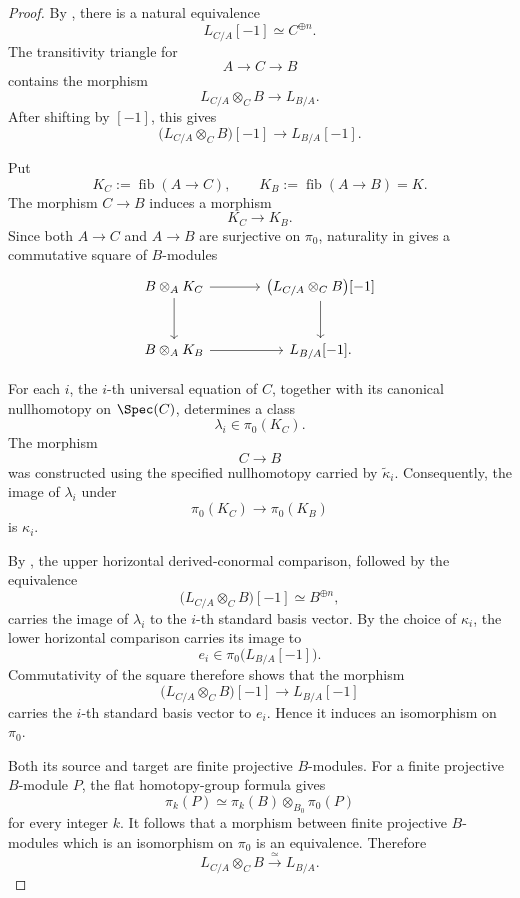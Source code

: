 \begin{proof}
By , there is a natural
equivalence
\[
    L_{C/A}[-1]
    \simeq
    C^{\oplus n}.
\]
The transitivity triangle for
\[
    A
    \longrightarrow
    C
    \longrightarrow
    B
\]
contains the morphism
\[
    L_{C/A}\otimes_CB
    \longrightarrow
    L_{B/A}.
\]
After shifting by \([-1]\), this gives
\[
    \bigl(
        L_{C/A}\otimes_CB
    \bigr)[-1]
    \longrightarrow
    L_{B/A}[-1].
\]

Put
\[
    K_C
    :=
    \operatorname{fib}(A\to C),
    \qquad
    K_B
    :=
    \operatorname{fib}(A\to B)=K.
\]
The morphism \(C\to B\) induces a morphism
\[
    K_C
    \longrightarrow
    K_B.
\]
Since both \(A\to C\) and \(A\to B\) are surjective on \(\pi_0\),
naturality in
gives a commutative square of \(B\)-modules
\[
\begin{tikzcd}[column sep=large, row sep=large]
    B\otimes_AK_C
        \arrow[r]
        \arrow[d]
    &
    \bigl(
        L_{C/A}\otimes_CB
    \bigr)[-1]
        \arrow[d]
    \\
    B\otimes_AK_B
        \arrow[r]
    &
    L_{B/A}[-1].
\end{tikzcd}
\]

For each \(i\), the \(i\)-th universal equation of \(C\), together with
its canonical nullhomotopy on \(\Spec(C)\), determines a class
\[
    \lambda_i
    \in
    \pi_0(K_C).
\]
The morphism
\[
    C
    \longrightarrow
    B
\]
was constructed using the specified nullhomotopy carried by
\(\widetilde\kappa_i\). Consequently, the image of \(\lambda_i\) under
\[
    \pi_0(K_C)
    \longrightarrow
    \pi_0(K_B)
\]
is \(\kappa_i\).

By
,
the upper horizontal derived-conormal comparison, followed by the
equivalence
\[
    \bigl(
        L_{C/A}\otimes_CB
    \bigr)[-1]
    \simeq
    B^{\oplus n},
\]
carries the image of \(\lambda_i\) to the \(i\)-th standard basis
vector. By the choice of \(\kappa_i\), the lower horizontal comparison
carries its image to
\[
    e_i
    \in
    \pi_0
    \bigl(
        L_{B/A}[-1]
    \bigr).
\]
Commutativity of the square therefore shows that the morphism
\[
    \bigl(
        L_{C/A}\otimes_CB
    \bigr)[-1]
    \longrightarrow
    L_{B/A}[-1]
\]
carries the \(i\)-th standard basis vector to \(e_i\). Hence it induces
an isomorphism on \(\pi_0\).

Both its source and target are finite projective \(B\)-modules. For a
finite projective \(B\)-module \(P\), the flat homotopy-group formula
gives
\[
    \pi_k(P)
    \simeq
    \pi_k(B)
    \otimes_{B_0}
    \pi_0(P)
\]
for every integer \(k\). It follows that a morphism between finite
projective \(B\)-modules which is an isomorphism on \(\pi_0\) is an
equivalence. Therefore
\[
    L_{C/A}\otimes_CB
    \xrightarrow{\simeq}
    L_{B/A}.
\]


\end{proof}
